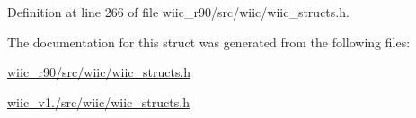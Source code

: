 Definition at line 266 of file wiic\-\_\-r90/src/wiic/wiic\-\_\-structs.\-h.



The documentation for this struct was generated from the following files\-:\begin{DoxyCompactItemize}
\item 
\hyperlink{wiic__r90_2src_2wiic_2wiic__structs_8h}{wiic\-\_\-r90/src/wiic/wiic\-\_\-structs.\-h}\item 
\hyperlink{wiic__v1_81_2src_2wiic_2wiic__structs_8h}{wiic\-\_\-v1./src/wiic/wiic\-\_\-structs.\-h}\end{DoxyCompactItemize}

